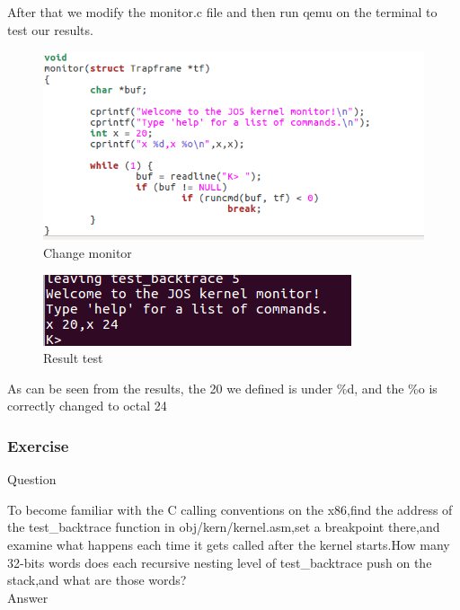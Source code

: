 After that we modify the monitor.c file and then run qemu on the terminal to test our results.
\begin{figure}[H]
  \centering
  \includegraphics[width=0.8\linewidth]{figure/monitor}
  \caption{Change monitor}\label{2}
\end{figure}
\begin{figure}[H]
  \centering
  \includegraphics[width=0.8\linewidth]{figure/resultofmonitor}
  \caption{Result test}\label{2}
\end{figure}


As can be seen from the results, the 20 we defined is under \%d, and the \%o is correctly changed to octal 24

\subsubsection{Exercise }
\begin{flushleft}
{\Large Question}

\qquad To become familiar with the C calling conventions on the x86,find the address of the test\_backtrace function in obj/kern/kernel.asm,set a breakpoint there,and examine what happens each time it gets called after the kernel starts.How many 32-bits words does each recursive nesting level of test\_backtrace push on the stack,and what are those words?\\


{\Large Answer}\\
\end{flushleft}


